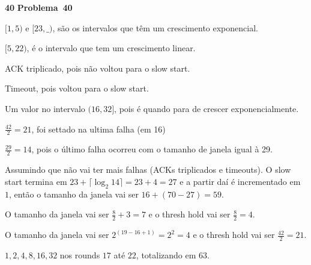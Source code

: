 \documentclass{article}
\newcounter{exe-list}
\newenvironment{exe-list}
    {\begin{list}{\alph{exe-list}.}{\usecounter{exe-list}}}
    {\end{list}}
\newenvironment{exe}[2][Problema]
    {\newcommand{\opt}{(Opcional)}%
    \newcommand{\sketch}[1]{{\bfseries Rascunho:} ##1}%
    \medskip\par\noindent\ifthenelse{\equal{#1}{}}
        {\textbf{\large #2}}
        {\textbf{\large #1~#2}}%
    \medskip\par\noindent}
    {\medskip}
\begin{document}
\begin{exe}{40}
    \begin{exe-list}
    \item \([1, 5)\) e \([23, \_)\),
        são os intervalos que têm um crescimento exponencial.
    \item \([5, 22)\),
        é o intervalo que tem um crescimento linear.
    \item ACK triplicado, pois não voltou para o slow start.
    \item Timeout, pois voltou para o slow start.
    \item Um valor no intervalo \((16, 32]\),
        pois é quando para de crescer exponencialmente.
    \item \(\frac{42}{2} = 21\),
        foi settado na ultima falha (em 16)
    \item \(\frac{29}{2} = 14\),
        pois o último falha ocorreu com o tamanho de janela
        igual à 29.
    \item Assumindo que não vai ter mais falhas
        (ACKs triplicados e timeouts).
        O slow start termina em
        \(23 + \lceil \log_2 14 \rceil = 23 + 4 = 27\)
        e a partir daí é incrementado em \(1\),
        então o tamanho da janela vai ser
        \(16 + (70 - 27) = 59\).
    \item O tamanho da janela vai ser \(\frac82 + 3 = 7\) e
        o thresh hold vai ser \(\frac82 = 4\).
    \item O tamanho da janela vai ser \(2^{(19-16+1)} = 2^{2} = 4\) e
        o thresh hold vai ser \(\frac{42}{2} = 21\).
    \item \(1, 2, 4, 8, 16, 32\) nos rounds \(17\) até \(22\),
        totalizando em \(63\).
    \end{exe-list}
\end{exe}
\end{document}
